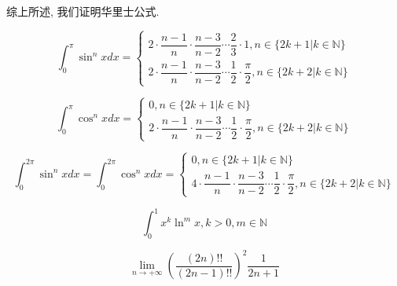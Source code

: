 \begin{theorem}[华里士公式]
	综上所述, 我们证明华里士公式.

	\begin{corollary}[华里士公式推论]
		$$\int_{0}^{\pi}\sin^{n}x dx =
	\begin{cases} 
	2\cdot\dfrac{n-1}{n}\cdot \dfrac{n-3}{n-2}\cdots \dfrac{2}{3}\cdot 1, n\in \{2k+1|k\in \mathbb{N}\} \\
	2\cdot\dfrac{n-1}{n}\cdot \dfrac{n-3}{n-2}\cdots \dfrac{1}{2}\cdot \dfrac{\pi}{2}, n\in \{2k+2|k\in \mathbb{N}\}  
	\end{cases}$$

	$$\int_{0}^{\pi}\cos^{n}x dx =
	\begin{cases} 
	0, n\in \{2k+1|k\in \mathbb{N}\} \\
	2\cdot\dfrac{n-1}{n}\cdot \dfrac{n-3}{n-2}\cdots \dfrac{1}{2}\cdot \dfrac{\pi}{2}, n\in \{2k+2|k\in \mathbb{N}\}  
	\end{cases}$$

	$$\int_{0}^{2\pi}\sin^{n}x dx = \int_{0}^{2\pi}\cos^{n} xdx =
	\begin{cases} 
	0, n\in \{2k+1|k\in \mathbb{N}\} \\
	4\cdot\dfrac{n-1}{n}\cdot \dfrac{n-3}{n-2}\cdots \dfrac{1}{2}\cdot \dfrac{\pi}{2}, n\in \{2k+2|k\in \mathbb{N}\}  
	\end{cases}$$
	\end{corollary}
\end{theorem}
\begin{proposition}
	$$\int_{0}^{1}x^{k}\ln^{m} x, k>0,m\in \mathbb{N}$$
\end{proposition}

\begin{proposition}
	$$\lim\limits_{n\to +\infty} \left(\dfrac{(2n)!!}{(2n-1)!!}\right)^{2}\dfrac{1}{2n+1}$$
\end{proposition}
